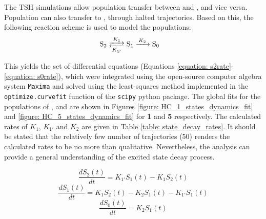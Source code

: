 The \ac{TSH} simulations allow population transfer between \stwo{} and \sone{}, and vice versa. Population can also transfer to \szero{}, through halted trajectories. Based on this, the following reaction scheme is used to model the populations:
\begin{align*}
\centering
\ce{&S_{2} <-->[{$K_{1}$}][{$K_{1'}$}] S_{1} ->[$K_{2}$] S_{0}}
\end{align*}

This yields the set of differential equations (Equations \ref{equation: s2rate}-\ref{equation: s0rate}), which were integrated using the open-source computer algebra system \texttt{Maxima} and solved using the least-squares method implemented in the \texttt{optimize.curve\textunderscore{}fit} function of the \texttt{scipy} python package.\cite{maxima,scipy} The global fits for the populations of \stwo{}, \sone{} and \szero{} are shown in Figures \ref{figure: HC_1_states_dynamics_fit} and \ref{figure: HC_5_states_dynamics_fit} for \textbf{1} and \textbf{5} respectively. The calculated rates of $K_{1}$, $K_{1'}$ and $K_{2}$ are given in Table \ref{table: state_decay_rates}. It should be stated that the relatively few number of trajectories (50) renders the calculated rates to be no more than qualitative. Nevertheless, the analysis can provide a general understanding of the excited state decay process. 

\begin{equation}\label{equation: s2rate}
    \frac{dS_{2}(t)}{dt}=K_{1'}S_{1}(t)-K_{1}S_{2}(t)
\end{equation}
\begin{equation}\label{equation: s1rate}
    \frac{dS_{1}(t)}{dt}=K_{1}S_{2}(t)-K_{2}S_{1}(t)-K_{1'}S_{1}(t)
\end{equation}
\begin{equation}\label{equation: s0rate}
    \frac{dS_{0}(t)}{dt}=K_{2}S_{1}(t)
\end{equation}

